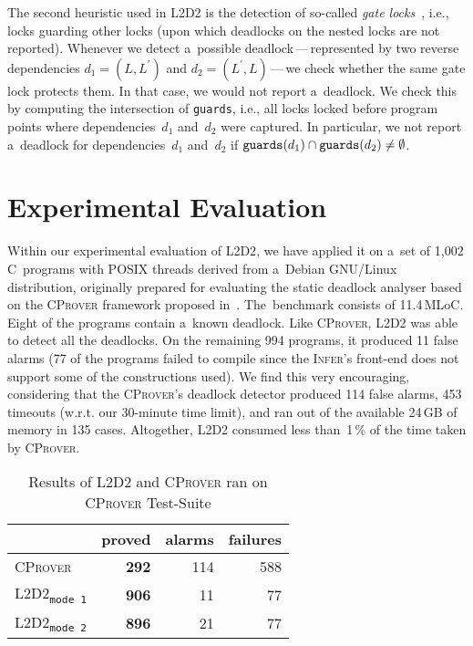 \documentclass[runningheads]{llncs}
\newcommand{\LLDD}{\textsc{L2D2}\xspace} %
\newcommand{\Infer}{\textsc{Infer}\xspace}
\newcommand{\CProver}{\textsc{CProver}\xspace}
\newcommand{\mOne}{\texttt{mode\,1}\xspace}
\newcommand{\mTwo}{\texttt{mode\,2}\xspace}
\begin{document}
The second heuristic used in \LLDD is the detection of so-called \emph{gate
locks}~\cite{goodlock00}, i.e., locks guarding other locks (upon which
deadlocks on the nested locks are not reported). Whenever we detect
a~possible deadlock\,---\,represented by two reverse dependencies
$ d_1 = (L, L^\prime) $ and $ d_2 = (L^\prime, L) $\,---\,we check whether
the same gate lock protects them. In that case, we would not
report a~deadlock. We check this by computing the intersection of
\texttt{guards}, i.e., all locks locked before program points where
dependencies~$ d_1 $ and~$ d_2 $ were captured. In particular, we not
report a~deadlock for dependencies~$ d_1 $ and~$ d_2 $ if
$ \text{\texttt{guards}}(d_1) \cap \text{\texttt{guards}}(d_2) \neq
\emptyset $.

\enlargethispage{4mm}

\vspace*{-4mm}\section{Experimental Evaluation}\vspace*{-2mm}
\label{sec:experiments}

Within our experimental evaluation of \LLDD, we have applied it on a~set of
1,002 C~programs with POSIX threads derived from a~Debian GNU/Linux
distribution, originally prepared for evaluating the static deadlock analyser
based on the \CProver framework proposed in~\cite{kroening16}.
%
The~benchmark consists of 11.4\,MLoC.
%
Eight of the programs contain a~known deadlock.
%
Like \CProver, \LLDD was able to detect all the deadlocks.
%
On the remaining 994 programs, it produced 11 false alarms (77 of the programs
failed to compile since the \Infer's front-end does not support some of the
constructions used).
%
We find this very encouraging, considering that the \CProver's deadlock
detector produced 114 false alarms, 453 timeouts (w.r.t. our 30-minute time
limit), and ran out of the available 24\,GB of memory in 135 cases.
%
Altogether, \LLDD consumed less than~1\,\% of the time taken by \CProver.

\begin{table}[t]
    \begin{center}
        \caption{Results of \LLDD and \CProver ran on \CProver Test-Suite}
        \begin{tabular}{l|r|r|r}
        & \textbf{proved} & alarms & failures \\ \hline
        \textsc{\CProver}  & \textbf{292}   & 114   & 588 \\ 
        \textsc{\LLDD}\textsubscript{\mOne} & \textbf{906} & 11 & 77 \\
        \textsc{\LLDD}\textsubscript{\mTwo}  & \textbf{896} & 21 & 77
        \end{tabular}
    \end{center}
    \vspace*{-4mm}
\end{table}
\end{document}
